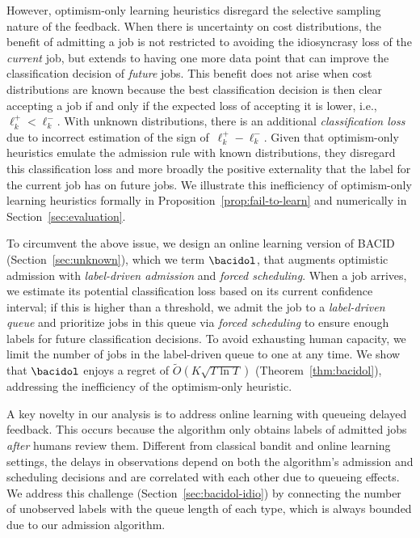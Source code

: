 However, optimism-only learning heuristics disregard the selective sampling nature of the feedback. When there is uncertainty on cost distributions, the benefit of admitting a job is not restricted to avoiding the idiosyncrasy loss of the \emph{current} job, but extends to having one more data point that can improve the classification decision of \emph{future} jobs. This benefit does not arise when cost distributions are known because the best classification decision is then clear \textemdash  accepting a job if and only if the expected loss of accepting it is lower, i.e., $\ell_k^+ < \ell_k^-$. With unknown distributions, there is an additional \emph{classification loss} due to incorrect estimation of the sign of~$\ell_k^+-\ell_k^-$. Given that optimism-only heuristics emulate the admission rule with known distributions, they disregard this classification loss and more broadly the positive externality that the label for the current job has on future jobs. We illustrate this inefficiency of optimism-only learning heuristics formally in Proposition~\ref{prop:fail-to-learn} and numerically in Section~\ref{sec:evaluation}.

To circumvent the above issue, we design an online learning version of \textsc{BACID} (Section~\ref{sec:unknown}), which we term $\bacidol$, that augments  optimistic admission with \emph{label-driven admission} and \emph{forced scheduling}. When a job arrives, we estimate its potential classification loss based on its current confidence interval; if this is higher than a threshold, we admit the job to a \emph{label-driven queue} and prioritize jobs in this queue via \emph{forced scheduling} to ensure enough labels for future classification decisions. To avoid exhausting human capacity, we limit the number of jobs in the label-driven queue to one at any time. We show that $\bacidol$ enjoys a regret of $\tilde{O}(K\sqrt{T\ln T})$ (Theorem~\ref{thm:bacidol}), addressing the inefficiency of the optimism-only heuristic. 

A key novelty in our analysis is to address online learning with queueing delayed feedback. This occurs because the algorithm only obtains labels of admitted jobs \emph{after} humans review them. Different from classical bandit and online learning settings, the delays in observations depend on both the algorithm's admission and scheduling decisions and are correlated with each other due to queueing effects. We address this challenge (Section~\ref{sec:bacidol-idio}) by connecting the number of unobserved labels with the queue length of each type, which is always bounded due to our admission algorithm.

